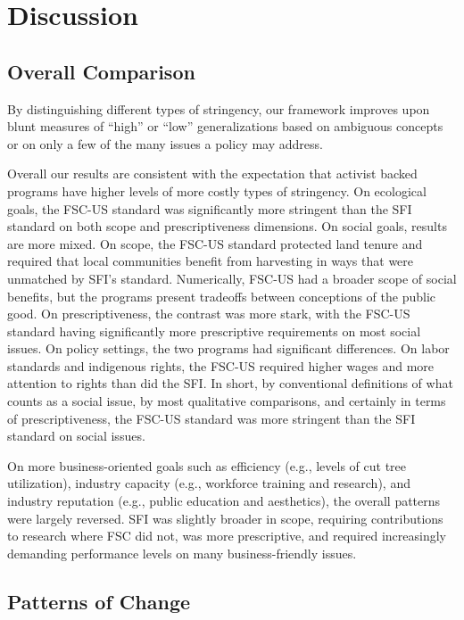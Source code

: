 \documentclass[
      12pt,
            Review ]{article}
\begin{document}
\hypertarget{discussion}{%
\section{Discussion}\label{discussion}}

\hypertarget{overall-comparison}{%
\subsection{Overall Comparison}\label{overall-comparison}}

By distinguishing different types of stringency, our framework improves upon blunt measures of ``high'' or ``low'' generalizations based on ambiguous concepts or on only a few of the many issues a policy may address.

Overall our results are consistent with the expectation that activist backed programs have higher levels of more costly types of stringency. On ecological goals, the FSC-US standard was significantly more stringent than the SFI standard on both scope and prescriptiveness dimensions. On social goals, results are more mixed. On scope, the FSC-US standard protected land tenure and required that local communities benefit from harvesting in ways that were unmatched by SFI's standard. Numerically, FSC-US had a broader scope of social benefits, but the programs present tradeoffs between conceptions of the public good. On prescriptiveness, the contrast was more stark, with the FSC-US standard having significantly more prescriptive requirements on most social issues. On policy settings, the two programs had significant differences. On labor standards and indigenous rights, the FSC-US required higher wages and more attention to rights than did the SFI. In short, by conventional definitions of what counts as a social issue, by most qualitative comparisons, and certainly in terms of prescriptiveness, the FSC-US standard was more stringent than the SFI standard on social issues.

On more business-oriented goals such as efficiency (e.g., levels of cut tree utilization), industry capacity (e.g., workforce training and research), and industry reputation (e.g., public education and aesthetics), the overall patterns were largely reversed. SFI was slightly broader in scope, requiring contributions to research where FSC did not, was more prescriptive, and required increasingly demanding performance levels on many business-friendly issues.

\hypertarget{patterns-of-change}{%
\subsection{Patterns of Change}\label{patterns-of-change}}
\end{document}
